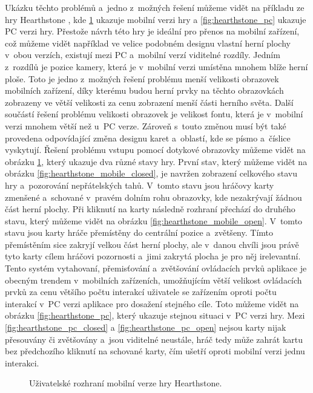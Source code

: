 Ukázku těchto problémů a~jedno z~možných řešení můžeme vidět na příkladu ze hry Hearthstone \citep{site:hearthstone}, kde  \ref{fig:hearthstone_mobile} ukazuje mobilní verzi hry a \ref{fig:hearthstone_pc} ukazuje PC verzi hry. Přestože návrh této hry je ideální pro přenos na mobilní zařízení, což můžeme vidět například ve velice podobném designu vlastní herní plochy v~obou verzích, existují mezi PC a~mobilní verzí viditelné rozdíly. Jedním z~rozdílů je pozice kamery, která je v~mobilní verzi umístěna mnohem blíže herní ploše. Toto je jedno z~možných řešení problému menší velikosti obrazovek mobilních zařízení, díky kterému budou herní prvky na těchto obrazovkách zobrazeny ve větší velikosti za cenu zobrazení menší části herního světa. Další součástí řešení problému velikosti obrazovek je velikost fontu, která je v~mobilní verzi mnohem větší než u~PC verze. Zároveň s~touto změnou musí být také provedena odpovídající změna designu karet a~oblastí, kde se písmo a~číslice vyskytují. Řešení problému vstupu pomocí dotykové obrazovky můžeme vidět na obrázku \ref{fig:hearthstone_mobile}, který ukazuje dva různé stavy hry. První stav, který můžeme vidět na obrázku \ref{fig:hearthstone_mobile_closed}, je navržen zobrazení celkového stavu hry a~pozorování nepřátelských tahů. V~tomto stavu jsou hráčovy karty zmenšené a~schované v~pravém dolním rohu obrazovky, kde nezakrývají žádnou část herní plochy. Při kliknutí na karty následně rozhraní přechází do druhého stavu, který můžeme vidět na obrázku \ref{fig:hearthstone_mobile_open}. V~tomto stavu jsou karty hráče přemístěny do centrální pozice a~zvětšeny. Tímto přemístěním sice zakryjí velkou část herní plochy, ale v~danou chvíli jsou právě tyto karty cílem hráčovi pozornosti a~jimi zakrytá plocha je pro něj irelevantní. Tento systém vytahovaní, přemisťování a~zvětšování ovládacích prvků aplikace je obecným trendem v~mobilních zařízeních, umožňujícím větší velikost ovládacích prvků za cenu většího počtu interakcí uživatele se zařízením oproti počtu interakcí v~PC verzi aplikace pro dosažení stejného cíle. Toto můžeme vidět na obrázku \ref{fig:hearthstone_pc}, který ukazuje stejnou situaci v~PC verzi hry. Mezi \ref{fig:hearthstone_pc_closed} a \ref{fig:hearthstone_pc_open} nejsou karty nijak přesouvány či zvětšovány a~jsou viditelné neustále, hráč tedy může zahrát kartu bez předchozího kliknutí na schované karty, čím ušetří oproti mobilní verzi jednu interakci.
\begin{figure}[!tbp]
	\centering
	\hfill
	\caption{Uživatelské rozhraní mobilní verze hry Hearthstone.}
	\label{fig:hearthstone_mobile}
\end{figure}

